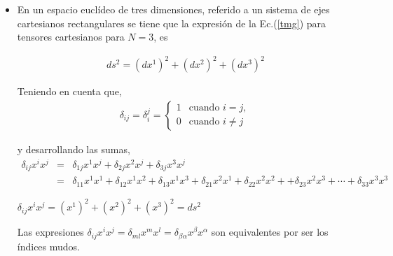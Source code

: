 \begin{remark}
\begin{itemize}
\item
En un espacio euclídeo de tres dimensiones, referido a un sistema de ejes cartesianos rectangulares se tiene que la expresión de la Ec.(\ref{tmg}) para tensores cartesianos para $N=3$, es

\begin{eqnarray}\label{ec_8}
ds^{2}= (dx^{1})^2+  (dx^{2})^2+(dx^{3})^2
\end{eqnarray}


\bigskip

Teniendo en cuenta que,
\begin{eqnarray*}
    \delta_{ij}=\delta_{i}^{j}=  
\left \{ \begin{array}{ll}
    1 &  \mbox{cuando $i=j$},  \\
    0  & \mbox{cuando $i \ne j$}
\end{array}
\end{eqnarray*}

\bigskip
\noindent
y desarrollando las sumas, 
\begin{eqnarray*}
\delta_{ij}x^ix^j&=&\delta_{1j}x^1x^j+ \delta_{2j}x^2x^j + \delta_{3j}x^3x^j\\
&=&\delta_{11}x^1x^1+\delta_{12}x^1x^2+ \delta_{13}x^1x^3+  \delta_{21}x^2x^1 + \delta_{22}x^2x^2 + 

+\delta_{23}x^2x^3 + \cdots +  \delta_{33}x^3x^3
\end{eqnarray*}

\bigskip

$\delta_{ij}x^ix^j= (x^{1})^{2}+(x^{2})^{2}+(x^{3})^{2}= ds^{2}$

\bigskip

\begin{remark}
 Las expresiones  $\delta_{ij}x^ix^j=\delta_{m l}x^m x^l=\delta_{\beta \alpha}x^\beta x^\alpha$ son equivalentes por ser los índices mudos.
\end{remark}

\bigskip












\end{itemize}
\end{remark}
